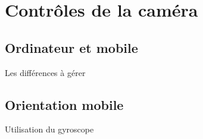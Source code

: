 \section{Contrôles de la caméra}
\subsection{Ordinateur et mobile}
Les différences à gérer
\subsection{Orientation mobile}
Utilisation du gyroscope